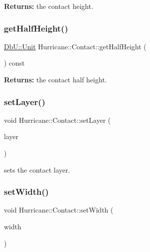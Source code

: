 {\bfseries Returns\+:} the contact height. \mbox{\label{classHurricane_1_1Contact_aebd3ff8e1368617ab750b20ae9ffb59b}} 
\subsubsection{\texorpdfstring{get\+Half\+Height()}{getHalfHeight()}}
{\footnotesize\ttfamily \mbox{\hyperlink{group__DbUGroup_ga4fbfa3e8c89347af76c9628ea06c4146}{Db\+U\+::\+Unit}} Hurricane\+::\+Contact\+::get\+Half\+Height (\begin{DoxyParamCaption}{ }\end{DoxyParamCaption}) const\hspace{0.3cm}{\ttfamily [inline]}}

{\bfseries Returns\+:} the contact half height. \mbox{\label{classHurricane_1_1Contact_a147644849f33bc4d58b6b997543c8306}} 
\subsubsection{\texorpdfstring{set\+Layer()}{setLayer()}}
{\footnotesize\ttfamily void Hurricane\+::\+Contact\+::set\+Layer (\begin{DoxyParamCaption}\item[{const \mbox{\hyperlink{classHurricane_1_1Layer}{Layer}} $\ast$}]{layer }\end{DoxyParamCaption})}

sets the contact layer. \mbox{\label{classHurricane_1_1Contact_aae6d5c96862fd6c834ff4abd61edc86f}} 
\subsubsection{\texorpdfstring{set\+Width()}{setWidth()}}
{\footnotesize\ttfamily void Hurricane\+::\+Contact\+::set\+Width (\begin{DoxyParamCaption}\item[{const \mbox{\hyperlink{group__DbUGroup_ga4fbfa3e8c89347af76c9628ea06c4146}{Db\+U\+::\+Unit}} \&}]{width }\end{DoxyParamCaption})}

